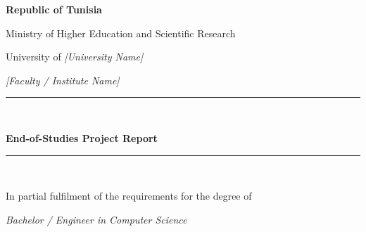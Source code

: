 \begin{titlepage}
  \centering
  \vspace*{0.5cm}

  {\Large\bfseries Republic of Tunisia\par}
  {\large Ministry of Higher Education and Scientific Research\par}
  \vspace{0.5cm}
  {\large University of \textit{[University Name]}\par}
  {\large \textit{[Faculty / Institute Name]}\par}

  \vspace{1.5cm}
  \rule{\linewidth}{0.6pt}\\[0.3cm]
  {\Large\bfseries End-of-Studies Project Report\par}
  \rule{\linewidth}{0.6pt}\\[0.5cm]

  {\large In partial fulfilment of the requirements for the degree of\par}
  {\Large\itshape Bachelor / Engineer in Computer Science\par}

  \vspace{1.8cm}

  \begin{center}
  \end{center}

  \vspace{1.5cm}


\end{titlepage}
